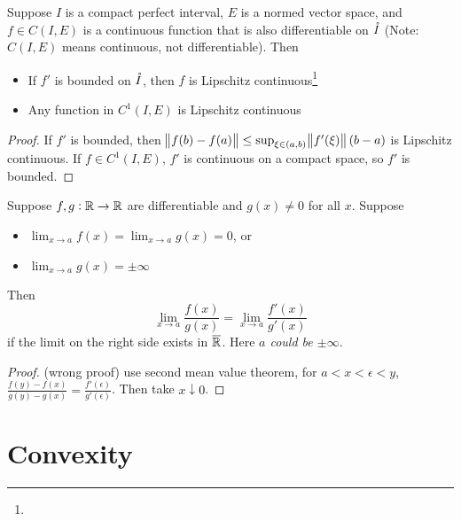 \begin{theorem}
    Suppose $I$ is a compact perfect interval, $E$ is a normed vector space, and $f \in C(I,E)$ is a continuous function that is also differentiable on $\mathring{I}$ (Note: $C(I,E)$ means continuous, not differentiable). Then
    \begin{itemize}
        \item If $f'$ is bounded on $\mathring{I}$, then $f$ is Lipschitz continuous\footnote{}
        \item Any function in $C^1(I,E)$ is Lipschitz continuous
    \end{itemize}
\end{theorem}
\begin{proof}
    If $f'$ is bounded, then $\norm{f(b) - f(a)} \leq \sup_{\xi \in (a,b)} \norm{f'(\xi)}(b-a)$ is Lipschitz continuous. If $f \in C^1(I,E)$, $f'$ is continuous on a compact space, so $f'$ is bounded.
\end{proof}


\begin{theorem}\label{hospital_rule}
    Suppose $f,g: \mathbb{R} \rightarrow \mathbb{R}$ are differentiable and $g(x) \neq 0$ for all $x$. Suppose
    \begin{itemize}
        \item $\displaystyle \lim_{x\rightarrow a} f(x) = \lim_{x\rightarrow a} g(x) = 0$, or
        \item $\displaystyle \lim_{x\rightarrow a} g(x) = \pm \infty$
    \end{itemize}
    Then
    \begin{equation}
        \lim_{x\rightarrow a}\frac{f(x)}{g(x)} = \lim_{x\rightarrow a}\frac{f'(x)}{g'(x)}
    \end{equation}
    if the limit on the right side exists in \emph{$\overline{\mathbb{R}}$}. Here \emph{$a$ could be $\pm \infty$}.
\end{theorem}
\begin{proof}
    (wrong proof) use second mean value theorem, for $a < x < \epsilon < y$, $\frac{f(y) - f(x)}{g(y) - g(x)} = \frac{f'(\epsilon)}{g'(\epsilon)}$. Then take $x \downarrow 0$.
\end{proof}






\section{Convexity}

